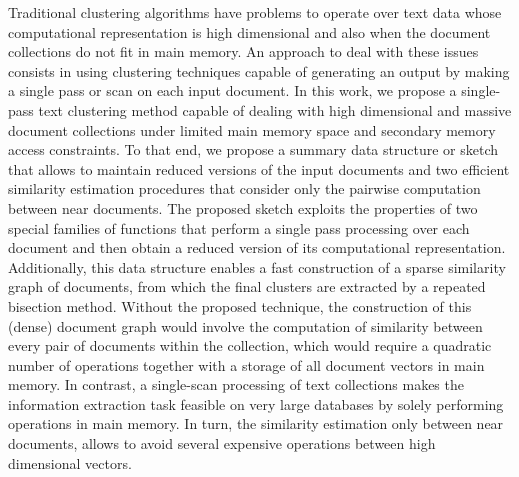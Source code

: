 \documentclass[10pt]{article}
\begin{document}
Traditional clustering algorithms have problems to operate over text data whose computational representation is high dimensional and also when the document collections do not fit in main memory. An approach to deal with these issues consists in using clustering techniques capable of generating an output by making a single pass or scan on each input document. In this work, we propose a single-pass text clustering method capable of dealing with high dimensional and massive document collections under limited main memory space and secondary memory access constraints. To that end, we propose a summary data structure or sketch that allows to maintain reduced versions of the input documents and two efficient similarity estimation procedures that consider only the pairwise computation between near documents. The proposed sketch exploits the properties of two special families of functions that perform a single pass processing over each document and then obtain a reduced version of its computational representation. Additionally, this data structure enables a fast construction of a sparse similarity graph of documents, from which the final clusters are extracted by a repeated bisection method. Without the proposed technique, the construction of this (dense) document graph would involve the computation of similarity between every pair of documents within the collection, which would require a quadratic number of operations together with a storage of all document vectors in main memory. In contrast, a single-scan processing of text collections makes the information extraction task feasible on very large databases by solely performing operations in main memory. In turn, the similarity estimation only between near documents, allows to avoid several expensive operations between high dimensional vectors.
\end{document}
